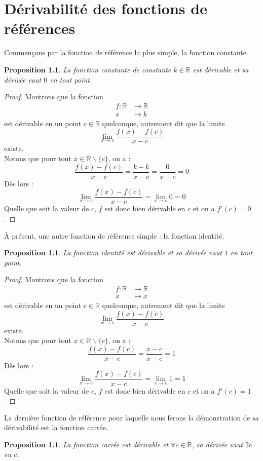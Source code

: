 \documentclass[a4paper,fontsize=13pt]{scrreprt}
\theoremstyle{plain}
\newtheorem{pro}[subsection]{Proposition}
\theoremstyle{definition}
\newcommand{\rr}{\mathbb{R}}
\begin{document}
\chapter{Dérivabilité des fonctions de références}
Commençons par la fonction de référence la plus simple, la fonction constante.
\begin{pro}
	La fonction constante de constante $k \in \rr$ est dérivable et sa dérivée vaut $0$ en tout point.
\end{pro}
\begin{proof}
	Montrons que la fonction
	\begin{align*}
	f : \rr &\to \rr \\
	x &\mapsto k
	\end{align*}
	est dérivable en un point $c \in \rr$ quelconque, autrement dit que la limite
	$$\lim\limits_{x \to c} \frac{f(x)-f(c)}{x-c}$$
	existe. \\
	Notons que pour tout $x \in \rr \backslash \{c\}$, on a :
	$$\frac{f(x)-f(c)}{x-c} = \frac{k-k}{x-c} = \frac{0}{x-c} = 0$$
	Dès lors :
	$$\lim\limits_{x \to c} \frac{f(x)-f(c)}{x-c} = \lim\limits_{x \to c} 0 = 0$$
	Quelle que soit la valeur de $c$, $f$ est donc bien dérivable en $c$ et on a $f'(c)=0$.
\end{proof}
À présent, une autre fonction de référence simple : la fonction identité.
\begin{pro}
	La fonction identité est dérivable et sa dérivée vaut $1$ en tout point.
\end{pro}
\begin{proof}
	Montrons que la fonction
	\begin{align*}
	f : \rr &\to \rr \\
	x &\mapsto x
	\end{align*}
	est dérivable en un point $c \in \rr$ quelconque, autrement dit que la limite
	$$\lim\limits_{x \to c} \frac{f(x)-f(c)}{x-c}$$
	existe. \\
	Notons que pour tout $x \in \rr \backslash \{c\}$, on a :
	$$\frac{f(x)-f(c)}{x-c} = \frac{x-c}{x-c} = 1$$
	Dès lors :
	$$\lim\limits_{x \to c} \frac{f(x)-f(c)}{x-c} = \lim\limits_{x \to c} 1 = 1$$
	Quelle que soit la valeur de $c$, $f$ est donc bien dérivable en $c$ et on a $f'(c)=1$.
\end{proof}
La dernière fonction de référence pour laquelle nous ferons la démonstration de sa dérivabilité est la fonction carrée.
\begin{pro}
	La fonction carrée est dérivable et $\forall c \in \rr$, sa dérivée vaut $2c$ en $c$.
\end{pro}
\end{document}
